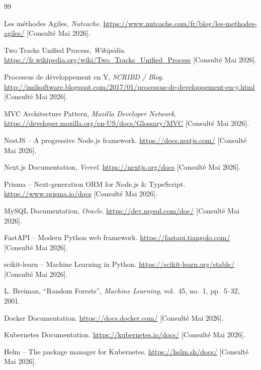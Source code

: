 \begin{thebibliography}{99}

    Les méthodes Agiles, \textit{Nutcache}.
    \url{https://www.nutcache.com/fr/blog/les-methodes-agiles/}
    [Consulté Mai 2026].

    Two Tracks Unified Process, \textit{Wikipédia}.
    \url{https://fr.wikipedia.org/wiki/Two_Tracks_Unified_Process}
    [Consulté Mai 2026].

    Processus de développement en Y, \textit{SCRIBD / Blog}.
    \url{http://imilsoftware.blogspot.com/2017/01/processus-de-developpement-en-y.html}
    [Consulté Mai 2026].

    MVC Architecture Pattern, \textit{Mozilla Developer Network}.
    \url{https://developer.mozilla.org/en-US/docs/Glossary/MVC}
    [Consulté Mai 2026].

    NestJS -- A progressive Node.js framework.
    \url{https://docs.nestjs.com/}
    [Consulté Mai 2026].

    Next.js Documentation, \textit{Vercel}.
    \url{https://nextjs.org/docs}
    [Consulté Mai 2026].

    Prisma -- Next-generation ORM for Node.js \& TypeScript.
    \url{https://www.prisma.io/docs}
    [Consulté Mai 2026].

    MySQL Documentation, \textit{Oracle}.
    \url{https://dev.mysql.com/doc/}
    [Consulté Mai 2026].

    FastAPI -- Modern Python web framework.
    \url{https://fastapi.tiangolo.com/}
    [Consulté Mai 2026].

    scikit-learn -- Machine Learning in Python.
    \url{https://scikit-learn.org/stable/}
    [Consulté Mai 2026].

    L. Breiman, ``Random Forests'', \textit{Machine Learning}, vol.~45, no.~1,
    pp.~5--32, 2001.

    Docker Documentation.
    \url{https://docs.docker.com/}
    [Consulté Mai 2026].

    Kubernetes Documentation.
    \url{https://kubernetes.io/docs/}
    [Consulté Mai 2026].

    Helm -- The package manager for Kubernetes.
    \url{https://helm.sh/docs/}
    [Consulté Mai 2026].


\end{thebibliography}
